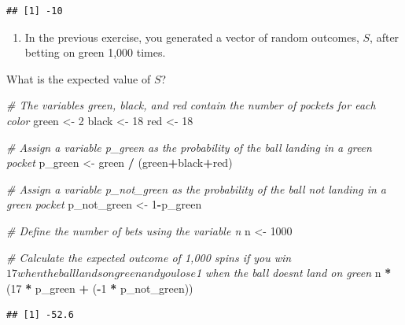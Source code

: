 \documentclass[
]{article}
\newenvironment{Shaded}{\begin{snugshade}}{\end{snugshade}}
\newcommand{\CommentTok}[1]{\textcolor[rgb]{0.56,0.35,0.01}{\textit{#1}}}
\newcommand{\DecValTok}[1]{\textcolor[rgb]{0.00,0.00,0.81}{#1}}
\newcommand{\NormalTok}[1]{#1}
\newcommand{\OperatorTok}[1]{\textcolor[rgb]{0.81,0.36,0.00}{\textbf{#1}}}
\newcommand{\StringTok}[1]{\textcolor[rgb]{0.31,0.60,0.02}{#1}}
\providecommand{\tightlist}{%
  \setlength{\itemsep}{0pt}\setlength{\parskip}{0pt}}
\begin{document}
\begin{verbatim}
## [1] -10
\end{verbatim}

\begin{enumerate}
\def\labelenumi{\arabic{enumi}.}
\setcounter{enumi}{5}
\tightlist
\item
  In the previous exercise, you generated a vector of random outcomes,
  \(S\), after betting on green 1,000 times.
\end{enumerate}

What is the expected value of \(S\)?

\begin{Shaded}
\begin{Highlighting}[]
\CommentTok{\# The variables \textquotesingle{}green\textquotesingle{}, \textquotesingle{}black\textquotesingle{}, and \textquotesingle{}red\textquotesingle{} contain the number of pockets for each color}
\NormalTok{green \textless{}{-}}\StringTok{ }\DecValTok{2}
\NormalTok{black \textless{}{-}}\StringTok{ }\DecValTok{18}
\NormalTok{red \textless{}{-}}\StringTok{ }\DecValTok{18}

\CommentTok{\# Assign a variable \textasciigrave{}p\_green\textasciigrave{} as the probability of the ball landing in a green pocket}
\NormalTok{p\_green \textless{}{-}}\StringTok{ }\NormalTok{green }\OperatorTok{/}\StringTok{ }\NormalTok{(green}\OperatorTok{+}\NormalTok{black}\OperatorTok{+}\NormalTok{red)}

\CommentTok{\# Assign a variable \textasciigrave{}p\_not\_green\textasciigrave{} as the probability of the ball not landing in a green pocket}
\NormalTok{p\_not\_green \textless{}{-}}\StringTok{ }\DecValTok{1}\OperatorTok{{-}}\NormalTok{p\_green}

\CommentTok{\# Define the number of bets using the variable \textquotesingle{}n\textquotesingle{}}
\NormalTok{n \textless{}{-}}\StringTok{ }\DecValTok{1000}

\CommentTok{\# Calculate the expected outcome of 1,000 spins if you win $17 when the ball lands on green and you lose $1 when the ball doesn\textquotesingle{}t land on green}
\NormalTok{n }\OperatorTok{*}\StringTok{ }\NormalTok{(}\DecValTok{17} \OperatorTok{*}\StringTok{ }\NormalTok{p\_green }\OperatorTok{+}\StringTok{ }\NormalTok{(}\OperatorTok{{-}}\DecValTok{1} \OperatorTok{*}\StringTok{ }\NormalTok{p\_not\_green))}
\end{Highlighting}
\end{Shaded}

\begin{verbatim}
## [1] -52.6
\end{verbatim}
\end{document}
